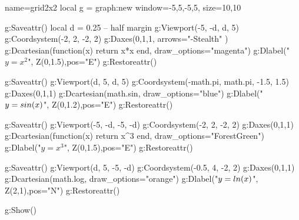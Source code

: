 \documentclass{standalone}
\begin{document}
\begin{luadraw}{name=grid2x2}
    local g = graph:new{
        window={-5,5,-5,5}, 
        size={10,10}
    }

    g:Saveattr()
    local d = 0.25 -- half margin
    g:Viewport(-5, -d, d, 5)
    g:Coordsystem(-2, 2, -2, 2)
        g:Daxes({0,1,1},{
            arrows="-Stealth"
        })
        g:Dcartesian(function(x) return x*x end, {draw_options="magenta"})
        g:Dlabel("$y=x^2$", Z(0,1.5),{pos="E"})
    g:Restoreattr()

    g:Saveattr()
    g:Viewport(d, 5, d, 5) 
    g:Coordsystem(-math.pi, math.pi, -1.5, 1.5)
        g:Daxes({0,1,1})
        g:Dcartesian(math.sin, {draw_options="blue"})
        g:Dlabel("$y=\\sin(x)$", Z(0,1.2),{pos="E"})
    g:Restoreattr()

    g:Saveattr()
    g:Viewport(-5, -d, -5, -d)
    g:Coordsystem(-2, 2, -2, 2)
        g:Daxes({0,1,1})
        g:Dcartesian(function(x) return x^3 end, {draw_options="ForestGreen"})
        g:Dlabel("$y=x^3$", Z(0,1.5),{pos="E"})
    g:Restoreattr()

    g:Saveattr()
    g:Viewport(d, 5, -5, -d)
    g:Coordsystem(-0.5, 4, -2, 2)
        g:Daxes({0,1,1})
        g:Dcartesian(math.log, {draw_options="orange"})
        g:Dlabel("$y=\\ln(x)$", Z(2,1),{pos="N"})
    g:Restoreattr()

    g:Show()
    \end{luadraw}
\end{document}
